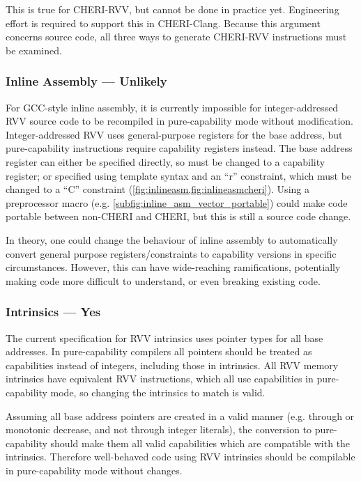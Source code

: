 This is true for CHERI-RVV, but cannot be done in practice yet.
Engineering effort is required to support this in CHERI-Clang.
Because this argument concerns source code, all three ways to generate CHERI-RVV instructions must be examined.

\subsubsection*{Inline Assembly --- Unlikely}
For GCC-style inline assembly, it is currently impossible for integer-addressed RVV source code to be recompiled in pure-capability mode without modification.
Integer-addressed RVV uses general-purpose registers for the base address, but pure-capability instructions require capability registers instead.
The base address register can either be specified directly, so must be changed to a capability register; or specified using template syntax and an ``r'' constraint, which must be changed to a ``C'' constraint (\cref{fig:inlineasm,fig:inlineasmcheri}).
Using a preprocessor macro (e.g. \cref{subfig:inline_asm_vector_portable}) could make code portable between non-CHERI and CHERI, but this is still a source code change.

In theory, one could change the behaviour of inline assembly to automatically convert general purpose registers/constraints to capability versions in specific circumstances.
However, this can have wide-reaching ramifications, potentially making code more difficult to understand, or even breaking existing code.

\subsubsection*{Intrinsics --- Yes}
The current specification for RVV intrinsics uses pointer types for all base addresses\cite{specification-RVV-intrinsics}.
In pure-capability compilers all pointers should be treated as capabilities instead of integers, including those in intrinsics.
All RVV memory intrinsics have equivalent RVV instructions, which all use capabilities in pure-capability mode, so changing the intrinsics to match is valid.

Assuming all base address pointers are created in a valid manner (e.g. through  or monotonic decrease, and not through integer literals), the conversion to pure-capability should make them all valid capabilities which are compatible with the intrinsics.
Therefore well-behaved code using RVV intrinsics should be compilable in pure-capability mode without changes.

